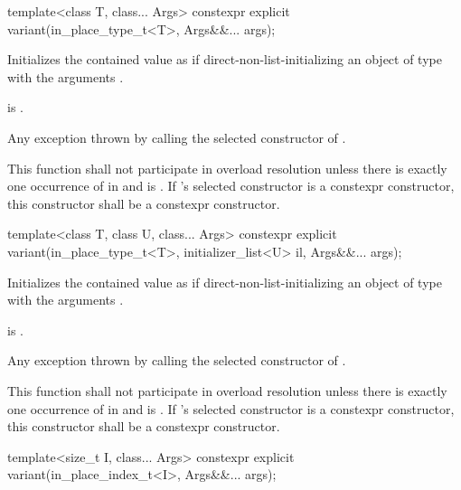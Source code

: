 %
\begin{itemdecl}
template<class T, class... Args> constexpr explicit variant(in_place_type_t<T>, Args&&... args);
\end{itemdecl}

\begin{itemdescr}
\pnum
\effects
Initializes the contained value as if direct-non-list-initializing
an object of type 
with the arguments .

\pnum
\ensures
{} is .

\pnum
\throws
Any exception thrown by calling the selected constructor of .

\pnum
\remarks
This function shall not participate in overload resolution unless there is
exactly one occurrence of  in  and
 is .
If 's selected constructor is a constexpr constructor, this
constructor shall be a constexpr constructor.
\end{itemdescr}

%
\begin{itemdecl}
template<class T, class U, class... Args>
  constexpr explicit variant(in_place_type_t<T>, initializer_list<U> il, Args&&... args);
\end{itemdecl}

\begin{itemdescr}
\pnum
\effects
Initializes the contained value as if direct-non-list-initializing
an object of type 
with the arguments .

\pnum
\ensures
{} is .

\pnum
\throws
Any exception thrown by calling the selected constructor of .

\pnum
\remarks
This function shall not participate in overload resolution unless there is
exactly one occurrence of  in  and
 is .
If 's selected constructor is a constexpr constructor, this
constructor shall be a constexpr constructor.
\end{itemdescr}

%
\begin{itemdecl}
template<size_t I, class... Args> constexpr explicit variant(in_place_index_t<I>, Args&&... args);
\end{itemdecl}


